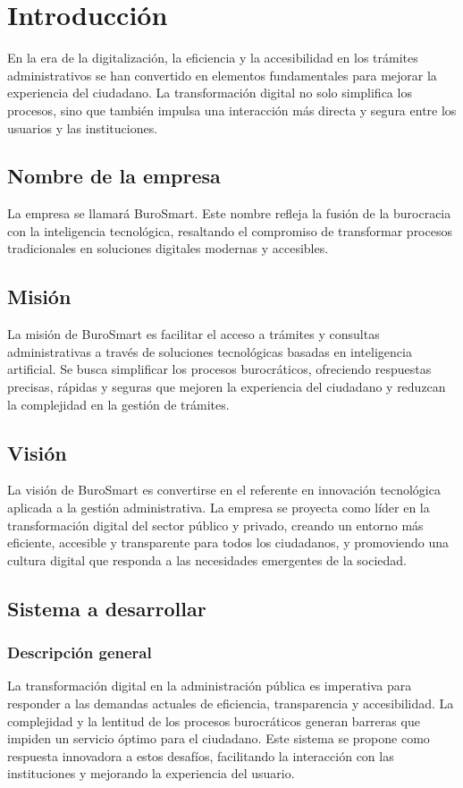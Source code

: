 \section{Introducción}
En la era de la digitalización, la eficiencia y la accesibilidad en los trámites administrativos se han convertido en elementos fundamentales para mejorar la experiencia del ciudadano. La transformación digital no solo simplifica los procesos, sino que también impulsa una interacción más directa y segura entre los usuarios y las instituciones.


\subsection{Nombre de la empresa}
La empresa se llamará BuroSmart. Este nombre refleja la fusión de la burocracia con la inteligencia tecnológica, resaltando el compromiso de transformar procesos tradicionales en soluciones digitales modernas y accesibles.

\subsection{Misión}
La misión de BuroSmart es facilitar el acceso a trámites y consultas administrativas a través de soluciones tecnológicas basadas en inteligencia artificial. Se busca simplificar los procesos burocráticos, ofreciendo respuestas precisas, rápidas y seguras que mejoren la experiencia del ciudadano y reduzcan la complejidad en la gestión de trámites.

\subsection{Visión}
La visión de BuroSmart es convertirse en el referente en innovación tecnológica aplicada a la gestión administrativa. La empresa se proyecta como líder en la transformación digital del sector público y privado, creando un entorno más eficiente, accesible y transparente para todos los ciudadanos, y promoviendo una cultura digital que responda a las necesidades emergentes de la sociedad.

\subsection{Sistema a desarrollar}

\subsubsection{Descripción general}
La transformación digital en la administración pública es imperativa para responder a las demandas actuales de eficiencia, transparencia y accesibilidad. La complejidad y la lentitud de los procesos burocráticos generan barreras que impiden un servicio óptimo para el ciudadano. Este sistema se propone como respuesta innovadora a estos desafíos, facilitando la interacción con las instituciones y mejorando la experiencia del usuario.

